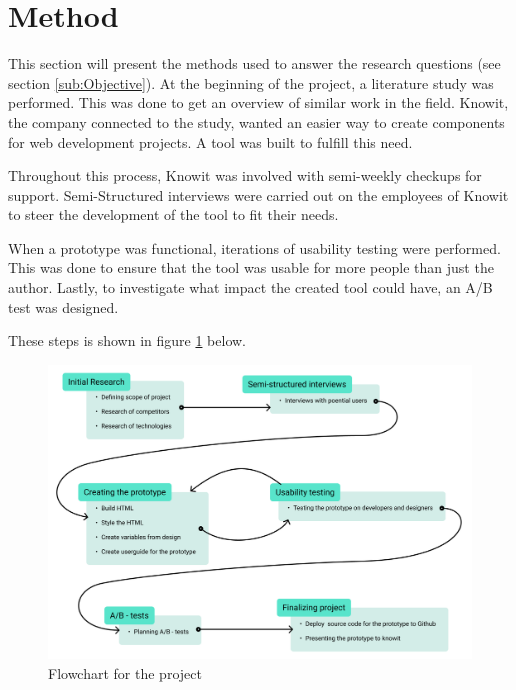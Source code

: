 \newpage
\section{Method}

This section will present the methods used to answer the research questions (see section \ref{sub:Objective}).  At the beginning of the project, a literature study was performed. This was done to get an overview of similar work in the field. Knowit, the company connected to the study, wanted an easier way to create components for web development projects. A tool was built to fulfill this need. 


Throughout this process, Knowit was involved with semi-weekly checkups for support. Semi-Structured interviews were carried out on the employees of Knowit to steer the development of the tool to fit their needs. 

When a prototype was functional, iterations of usability testing were performed. This was done to ensure that the tool was usable for more people than just the author. Lastly, to investigate what impact the created tool could have, an A/B test was designed.

These steps is shown in figure \ref{fig:projectFlowChart} below.


\begin{figure}[H]
  \includegraphics[width=\linewidth]{../images/Project flow chart.png}
  \caption{Flowchart for the project}
  \label{fig:projectFlowChart}
\end{figure}

